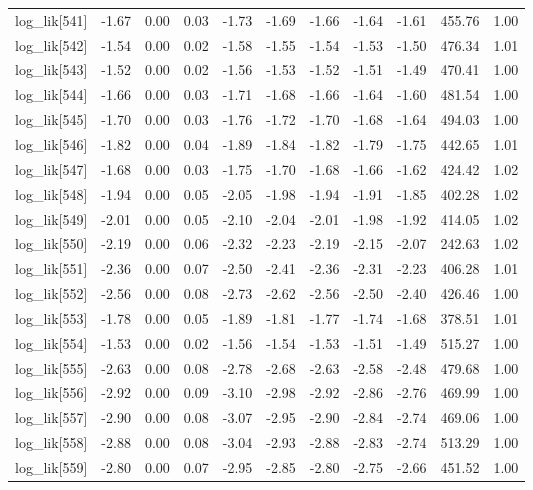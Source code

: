 \begin{table}[ht]
\begin{tabular}{rrrrrrrrrrr}
  log\_lik[541] & -1.67 & 0.00 & 0.03 & -1.73 & -1.69 & -1.66 & -1.64 & -1.61 & 455.76 & 1.00 \\ 
  log\_lik[542] & -1.54 & 0.00 & 0.02 & -1.58 & -1.55 & -1.54 & -1.53 & -1.50 & 476.34 & 1.01 \\ 
  log\_lik[543] & -1.52 & 0.00 & 0.02 & -1.56 & -1.53 & -1.52 & -1.51 & -1.49 & 470.41 & 1.00 \\ 
  log\_lik[544] & -1.66 & 0.00 & 0.03 & -1.71 & -1.68 & -1.66 & -1.64 & -1.60 & 481.54 & 1.00 \\ 
  log\_lik[545] & -1.70 & 0.00 & 0.03 & -1.76 & -1.72 & -1.70 & -1.68 & -1.64 & 494.03 & 1.00 \\ 
  log\_lik[546] & -1.82 & 0.00 & 0.04 & -1.89 & -1.84 & -1.82 & -1.79 & -1.75 & 442.65 & 1.01 \\ 
  log\_lik[547] & -1.68 & 0.00 & 0.03 & -1.75 & -1.70 & -1.68 & -1.66 & -1.62 & 424.42 & 1.02 \\ 
  log\_lik[548] & -1.94 & 0.00 & 0.05 & -2.05 & -1.98 & -1.94 & -1.91 & -1.85 & 402.28 & 1.02 \\ 
  log\_lik[549] & -2.01 & 0.00 & 0.05 & -2.10 & -2.04 & -2.01 & -1.98 & -1.92 & 414.05 & 1.02 \\ 
  log\_lik[550] & -2.19 & 0.00 & 0.06 & -2.32 & -2.23 & -2.19 & -2.15 & -2.07 & 242.63 & 1.02 \\ 
  log\_lik[551] & -2.36 & 0.00 & 0.07 & -2.50 & -2.41 & -2.36 & -2.31 & -2.23 & 406.28 & 1.01 \\ 
  log\_lik[552] & -2.56 & 0.00 & 0.08 & -2.73 & -2.62 & -2.56 & -2.50 & -2.40 & 426.46 & 1.00 \\ 
  log\_lik[553] & -1.78 & 0.00 & 0.05 & -1.89 & -1.81 & -1.77 & -1.74 & -1.68 & 378.51 & 1.01 \\ 
  log\_lik[554] & -1.53 & 0.00 & 0.02 & -1.56 & -1.54 & -1.53 & -1.51 & -1.49 & 515.27 & 1.00 \\ 
  log\_lik[555] & -2.63 & 0.00 & 0.08 & -2.78 & -2.68 & -2.63 & -2.58 & -2.48 & 479.68 & 1.00 \\ 
  log\_lik[556] & -2.92 & 0.00 & 0.09 & -3.10 & -2.98 & -2.92 & -2.86 & -2.76 & 469.99 & 1.00 \\ 
  log\_lik[557] & -2.90 & 0.00 & 0.08 & -3.07 & -2.95 & -2.90 & -2.84 & -2.74 & 469.06 & 1.00 \\ 
  log\_lik[558] & -2.88 & 0.00 & 0.08 & -3.04 & -2.93 & -2.88 & -2.83 & -2.74 & 513.29 & 1.00 \\ 
  log\_lik[559] & -2.80 & 0.00 & 0.07 & -2.95 & -2.85 & -2.80 & -2.75 & -2.66 & 451.52 & 1.00 \\ 

\end{tabular}
\end{table}
